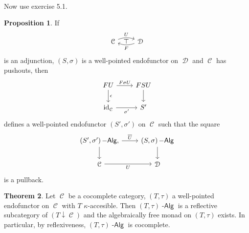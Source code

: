 \documentclass[a4paper,11pt,oneside,openany]{scrbook}
\DeclareMathOperator{\Alg}{-\mathsf{Alg}}
\DeclareMathOperator{\C}{\mathcal{C}}
\DeclareMathOperator{\D}{\mathcal{D}}
\DeclareMathOperator{\id}{id}
\theoremstyle{definition}
\newtheorem{thm}{Theorem}[section] %
\theoremstyle{definition}
\newtheorem{prop}[thm]{Proposition}
\begin{document}
Now use exercise 5.1.
\begin{prop}
    If
    \begin{displaymath}
        \begin{tikzcd}
	\C \arrow[r, "U", bend left=20]
	    \arrow[from=r, "F", bend left=20]
	    \arrow[r, phantom, "\top"]
	    & \D
        \end{tikzcd}
    \end{displaymath}
    is an adjunction, $ (S,\sigma) $ is a well-pointed endofunctor on $ \D $
    and $ \C $ has pushouts, then
    \begin{displaymath}
        \begin{tikzcd}
	    FU \arrow[r,"F\sigma U"]\arrow[d, "\epsilon"]& FSU \arrow[d]\\
	    \id_{\C} \arrow[r, "\sigma'"']& S'
        \end{tikzcd}
    \end{displaymath}
    defines a well-pointed endofunctor $ (S',\sigma') $ on $ \C $ such that the square
    \begin{displaymath}
        \begin{tikzcd}
	    (S',\sigma')\Alg \arrow[r, "\overline U"],\arrow[d]
	    & (S,\sigma)\Alg \arrow[d]\\
	    \C \arrow[r, "U"'] & \D
        \end{tikzcd}
    \end{displaymath}
    is a pullback.\hfill\qedsymbol
\end{prop}
\begin{thm}
    Let $ \C $ be a cocomplete category, $ (T,\tau) $ a well-pointed endofunctor on $ \C $ with $ T $ $ \kappa $-accesible.
    Then $ (T,\tau)\Alg $ is a reflective subcategory of $ (T\downarrow\C)$ and the algebraically free monad on $ (T,\tau) $ exists. In particular, by reflexiveness, $ (T,\tau)\Alg $ is cocomplete.
\end{thm}
\end{document}

